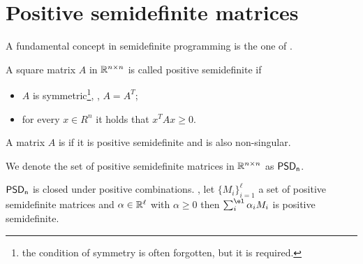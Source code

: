 \documentclass[a4paper,twoside,justified]{tufte-handout}
\begin{document}
 

\section{Positive semidefinite matrices}

A fundamental concept in semidefinite programming is the one of
. 
\begin{definition}
  A square matrix $A$ in $ \mathbb{R}^{n\times n} $ is called positive
  semidefinite if 
  \begin{itemize}
    \item $A$ is symmetric\footnote{the condition of symmetry is often
      forgotten, but it is required.}, \ie, $ A=A^{T} $;
    \item for every $ x\in R^{n} $ it holds that $ x^{T} A x \geq 0 $.
  \end{itemize}
  A matrix $ A $ is  if it is
  positive semidefinite and is also non-singular.
\end{definition}
We denote the set of positive semidefinite matrices in $\mathbb{R}^{n\times
  n}$ as $\mathsf{PSD_{n}}$.

\begin{fact}
  $ \mathsf{PSD_{n}} $ is closed under positive
  combinations. \Ie, let $ \{M_{i}\}^{\ell}_{i=1} $ a set of positive
  semidefinite matrices and $ \alpha \in \mathbb{R}^{\ell} $ with $ \alpha
  \geq 0 $ then $ \sum^{\el}_{i} \alpha_{i} M_{i}$ is positive
  semidefinite.
\end{fact}



\end{document}
